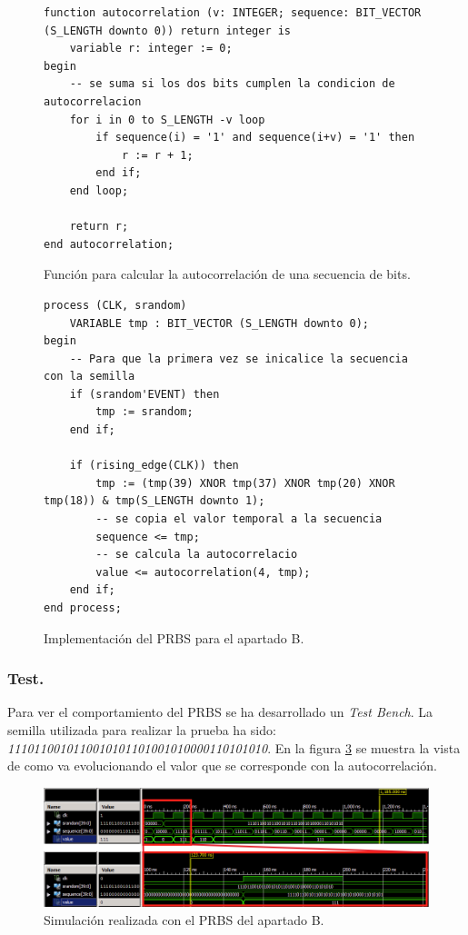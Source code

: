\documentclass{article}
\begin{document}
\begin{figure}[h]
	\begin{lstlisting}[style=vhdl]
function autocorrelation (v: INTEGER; sequence: BIT_VECTOR (S_LENGTH downto 0)) return integer is
	variable r: integer := 0;
begin
	-- se suma si los dos bits cumplen la condicion de autocorrelacion
	for i in 0 to S_LENGTH -v loop
		if sequence(i) = '1' and sequence(i+v) = '1' then
			r := r + 1;
		end if;
	end loop;
	
	return r;
end autocorrelation;
	\end{lstlisting}
	\caption{Función para calcular la autocorrelación de una secuencia de bits.}
	\label{cod:p5b:autocorrelacion}
\end{figure}

\begin{figure}[h]
	\begin{lstlisting}[style=vhdl]
process (CLK, srandom)
	VARIABLE tmp : BIT_VECTOR (S_LENGTH downto 0);
begin
	-- Para que la primera vez se inicalice la secuencia con la semilla
	if (srandom'EVENT) then
		tmp := srandom;
	end if;
	
	if (rising_edge(CLK)) then
		tmp := (tmp(39) XNOR tmp(37) XNOR tmp(20) XNOR tmp(18)) & tmp(S_LENGTH downto 1);
		-- se copia el valor temporal a la secuencia
		sequence <= tmp;
		-- se calcula la autocorrelacio
		value <= autocorrelation(4, tmp);
	end if;
end process;
	\end{lstlisting}
	\caption{Implementación del PRBS para el apartado B.}
	\label{cod:p5b:process}
\end{figure}

\subsubsection{Test.}

	Para ver el comportamiento del PRBS se ha desarrollado un \emph{Test Bench}. La semilla utilizada para realizar la prueba ha sido: \emph{1110110010110010101101001010000110101010}.
	En la figura \ref{fig:p5b:tb} se muestra la vista de como va evolucionando el valor que se corresponde con la autocorrelación.

\begin{figure}[h]
  \centering
    \includegraphics[width=1\textwidth]{img/p5b_tb.png}
  \caption{Simulación realizada con el PRBS del apartado B.}
  \label{fig:p5b:tb}
\end{figure}
\end{document}
